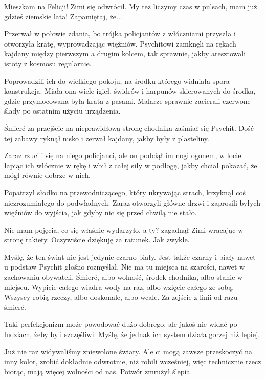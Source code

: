 \ds{} Mieszkam na Felicji! \dm{} Zimi się odwrócił. \dm{} My też liczymy czas w pulsach, mam już gdzieś ziemskie lata! Zapamiętaj, że... \de{}

Przerwał w połowie zdania, bo trójka policjantów z włóczniami przyszła i otworzyła kratę, wyprowadzając więźniów.
Psychitowi zamknęli na rękach kajdany między pierwszym a drugim kolcem, tak sprawnie, jakby aresztowali istoty z kosmosu regularnie.

Poprowadzili ich do wielkiego pokoju, na środku którego widniała spora konstrukcja.
Miała ona wiele igieł, świdrów i harpunów skierowanych do środka, gdzie przymocowana była krata z pasami.
Malarze sprawnie zacierali czerwone ślady po ostatnim użyciu urządzenia.

\ds{} Śmierć za przejście na nieprawidłową stronę chodnika \dm{} zaśmiał się Psychit. \dm{} Dość tej zabawy \de{} ryknął nisko i zerwał kajdany, jakby były z plasteliny. \de{}

Zaraz rzucili się na niego policjanci, ale on podciął im nogi ogonem, w locie łapiąc ich włócznie w rękę i wbił z całej siły w podłogę, jakby chciał pokazać, że mógł równie dobrze w nich.

Popatrzył słodko na przewodniczącego, który ukrywając strach, krzyknął coś niezrozumiałego do podwładnych.
Zaraz otworzyli główne drzwi i zaprosili byłych więźniów do wyjścia, jak gdyby nic się przed chwilą nie stało.

\divider{}
\ds{} Nie mam pojęcia, co się właśnie wydarzyło, a ty? \dm{} zagadnął Zimi wracając w stronę rakiety. \dm{} Oczywiście dziękuję za ratunek. Jak zwykle. \de{}

\ds{} Myślę, że ten świat nie jest jedynie czarno-biały. Jest także czarny i biały nawet u podstaw \dm{} Psychit głośno rozmyślał. \dm{} 
Nie ma tu miejsca na szarości, nawet w zachowaniu obywateli. Śmierć, albo wolność, środek chodnika, albo stanie w miejscu. 
Wypicie całego wiadra wody na raz, albo wzięcie całego ze sobą. Wszyscy robią rzeczy, albo doskonale, albo wcale. Za zejście z linii od razu śmierć.\de{}

\ds{} Taki perfekcjonizm może powodować dużo dobrego, ale jakoś nie widać po ludziach, żeby byli szczęśliwi. Myślę, że jednak ich system działa gorzej niż lepiej. \de{}

\ds{} Już nie raz widywaliśmy zniewolone światy. Ale ci mogą zawsze przeskoczyć na inny kolor, zrobić dokładnie odwrotnie, niż robili wcześniej, więc technicznie rzecz biorąc, mają więcej wolności od nas.
\dm{} Potwór zmrużył ślepia.\de{}

